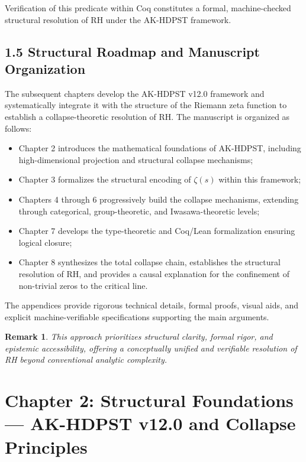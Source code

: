 \documentclass[11pt]{article}
\newtheorem{remark}[theorem]{Remark}
\begin{document}
Verification of this predicate within Coq constitutes a formal, machine-checked structural resolution of RH under the AK-HDPST framework.

\subsection*{1.5 Structural Roadmap and Manuscript Organization}

The subsequent chapters develop the AK-HDPST v12.0 framework and systematically integrate it with the structure of the Riemann zeta function to establish a collapse-theoretic resolution of RH. The manuscript is organized as follows:

\begin{itemize}
    \item Chapter 2 introduces the mathematical foundations of AK-HDPST, including high-dimensional projection and structural collapse mechanisms;
    \item Chapter 3 formalizes the structural encoding of $\zeta(s)$ within this framework;
    \item Chapters 4 through 6 progressively build the collapse mechanisms, extending through categorical, group-theoretic, and Iwasawa-theoretic levels;
    \item Chapter 7 develops the type-theoretic and Coq/Lean formalization ensuring logical closure;
    \item Chapter 8 synthesizes the total collapse chain, establishes the structural resolution of RH, and provides a causal explanation for the confinement of non-trivial zeros to the critical line.
\end{itemize}

The appendices provide rigorous technical details, formal proofs, visual aids, and explicit machine-verifiable specifications supporting the main arguments.

\begin{remark}
This approach prioritizes structural clarity, formal rigor, and epistemic accessibility, offering a conceptually unified and verifiable resolution of RH beyond conventional analytic complexity.
\end{remark}



\section{Chapter 2: Structural Foundations — AK-HDPST v12.0 and Collapse Principles}
\end{document}
